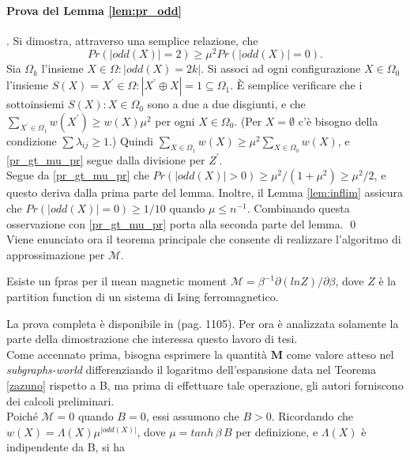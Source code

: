 \paragraph{Prova del Lemma \ref{lem:pr_odd}}. Si dimostra, attraverso una semplice relazione, che
\begin{equation}
	Pr(|odd(X)| = 2) \geq \mu^2 Pr(|odd(X)| = 0).
	\label{pr_gt_mu_pr}
\end{equation}
Sia $\Omega_k$ l'insieme ${X \in \Omega : |odd(X) = 2k|}$. Si associ ad ogni configurazione $X \in \Omega_0$ l'insieme $S(X) = {X^{\prime} \in \Omega : |X^{\prime} \oplus X| = 1} \subseteq \Omega_1$. È semplice verificare che i sottoinsiemi ${S(X) : X \in \Omega_0}$ sono a due a due disgiunti, e che $\sum_{X^\prime\in\Omega_1}{w(X^{\prime}) \geq w(X)\mu^2}$ per ogni $X \in \Omega_0$. (Per $X = \emptyset$ c'è bisogno della condizione $\sum{\lambda_{ij}} \geq 1$.) Quindi $\sum_{X\in\Omega_1}{w(X)\geq\mu^2\sum_{X\in\Omega_0}{w(X)}}$, e \ref{pr_gt_mu_pr} segue dalla divisione per $Z^\prime$.\\
Segue da \ref{pr_gt_mu_pr} che $Pr(|odd(X)| > 0) \geq \mu^2/(1+\mu^2) \geq \mu^2/2$, e questo deriva dalla prima parte del lemma. Inoltre, il Lemma \ref{lem:inflim} assicura che $Pr(|odd(X)| = 0) \geq 1/10$ quando $\mu \leq n^{-1}$. Combinando questa osservazione con \ref{pr_gt_mu_pr} porta alla seconda parte del lemma. \qed\\
Viene enunciato ora il teorema principale che consente di realizzare l'algoritmo di approssimazione per $\mathcal{M}$.
\begin{thm}
	Esiste un fpras per il mean magnetic moment $\mathcal{M} = \beta^{-1}\partial(lnZ)/\partial\beta$, dove $Z$ è la partition function di un sistema di Ising ferromagnetico.
	\label{thm:fpras_mmm}
\end{thm}
La prova completa è disponibile in \cite{jerrum1993polynomial} (pag. 1105). Per ora è analizzata solamente la parte della dimostrazione che interessa questo lavoro di tesi.\\
Come accennato prima, bisogna esprimere la quantità $\mathbf{M}$ come valore atteso nel \textit{subgraphs-world} differenziando il logaritmo dell'espansione data nel Teorema \ref{zazuno} rispetto a B, ma prima di effettuare tale operazione, gli autori forniscono dei calcoli preliminari.\\
Poiché $\mathcal{M} = 0$ quando $B = 0$, essi assumono che $B > 0$. Ricordando che $w(X) = \Lambda(X)\mu^{|odd(X)|}$, dove $\mu = tanh\,\beta\,B$ per definizione, e $\Lambda(X)$ è indipendente da B, si ha
